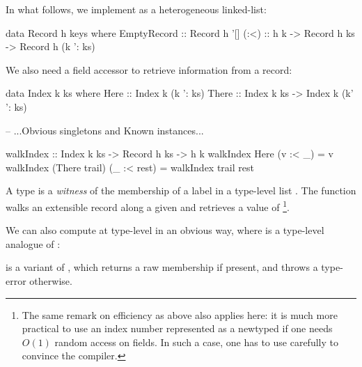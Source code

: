 \documentclass[demotion-paper.tex]{subfiles}
\begin{document}
In what follows, we implement  as a heterogeneous linked-list\cite{Kiselyov:2004}\footnotemark:
\begin{code}
data Record h keys where
  EmptyRecord :: Record h '[]
  (:<) :: h k -> Record h ks -> Record h (k ': ks)
\end{code}
We also need a field accessor to retrieve information from a record:
\begin{code}
data Index k ks where
  Here  :: Index k (k ': ks)
  There :: Index k ks -> Index k (k' ': ks)

-- ...Obvious singletons and Known instances...

walkIndex :: Index k ks -> Record h ks -> h k
walkIndex Here (v :< _) = v
walkIndex (There trail) (_ :< rest) = 
  walkIndex trail rest  
\end{code}
A type  is a \emph{witness} of the membership of a label  in a type-level list .
The function  walks an extensible record along a given  and retrieves a value of \footnote{The same remark on efficiency as above also applies here: it is much more practical to use an index number represented as a newtyped  if one needs $O(1)$ random access on fields.
In such a case, one has to use  carefully to convince the compiler.}.

We can also compute  at type-level in an obvious way, where \haskinline{(<$>)} is a type-level analogue of \hask{(<$>)}:
 is a variant of , which returns a raw membership if present, and throws a type-error otherwise.
\end{document}

